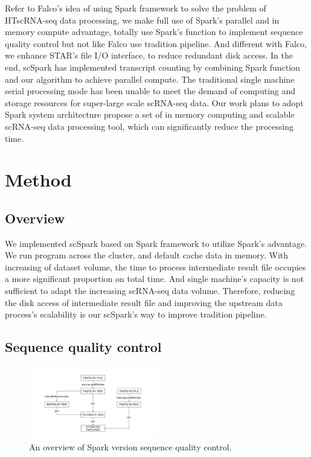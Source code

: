 \documentclass[conference]{IEEEtran}
\begin{document}
Refer to Falco's idea of using Spark framework to solve the problem of HTscRNA-seq data processing, we make full use of Spark's parallel and in memory compute advantage, totally use Spark's function to implement sequence quality control but not like Falco use tradition pipeline. 
And different with Falco, we enhance STAR's file I/O interface, to reduce redundant disk access.
In the end, scSpark has implemented transcript counting by combining Spark function and our algorithm to achieve parallel compute. 
The traditional single machine serial processing mode has been unable to meet the demand of computing and storage resources for super-large scale scRNA-seq data. 
Our work plans to adopt Spark system architecture propose a set of in memory computing and scalable scRNA-seq data processing tool, which can significantly reduce the processing time. 

\section{Method}
\subsection{Overview}
We implemented scSpark based on Spark framework to utilize Spark's advantage. 
We run program across the cluster, and default cache data in memory. 
With increasing of dataset volume, the time to process intermediate result file occupies a more significant proportion on total time. 
And single machine's capacity is not sufficient to adapt the increasing scRNA-seq data volume. 
Therefore, reducing the disk access of intermediate result file and improving the upstream data process's scalability is our scSpark's way to improve tradition pipeline. 

\subsection{Sequence quality control}
\begin{figure}
  \includegraphics[width=0.5\textwidth]{fig1.pdf}
  \caption{An overview of Spark version sequence quality control.} \label{fig1}
\end{figure} 
\end{document}
